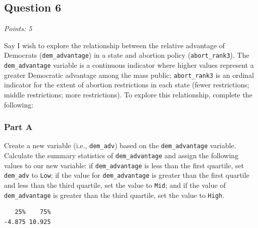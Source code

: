 \documentclass[
  letterpaper,
  DIV=11,
  numbers=noendperiod]{scrartcl}
\newenvironment{Shaded}{\begin{snugshade}}{\end{snugshade}}
\newcommand{\AttributeTok}[1]{\textcolor[rgb]{0.40,0.45,0.13}{#1}}
\newcommand{\FloatTok}[1]{\textcolor[rgb]{0.68,0.00,0.00}{#1}}
\newcommand{\FunctionTok}[1]{\textcolor[rgb]{0.28,0.35,0.67}{#1}}
\newcommand{\NormalTok}[1]{\textcolor[rgb]{0.00,0.23,0.31}{#1}}
\newcommand{\OtherTok}[1]{\textcolor[rgb]{0.00,0.23,0.31}{#1}}
\newcommand{\SpecialCharTok}[1]{\textcolor[rgb]{0.37,0.37,0.37}{#1}}
\begin{document}
\hypertarget{question-6}{%
\subsection{Question 6}\label{question-6}}

\emph{Points: 5}

Say I wish to explore the relationship between the relative advantage of
Democrats (\texttt{dem\_advantage}) in a state and abortion policy
(\texttt{abort\_rank3}). The \texttt{dem\_advantage} variable is a
continuous indicator where higher values represent a greater Democratic
advantage among the mass public; \texttt{abort\_rank3} is an ordinal
indicator for the extent of abortion restrictions in each state (fewer
restrictions; middle restrictions; more restrictions). To explore this
relationship, complete the following:

\hypertarget{part-a}{%
\subsubsection{Part A}\label{part-a}}

Create a new variable (i.e., \texttt{dem\_adv}) based on the
\texttt{dem\_advantage} variable. Calculate the summary statistics of
\texttt{dem\_advantage} and assign the following values to our new
variable: if \texttt{dem\_advantage} is less than the first quartile,
set \texttt{dem\_adv} to \texttt{Low}; if the value for
\texttt{dem\_advantage} is greater than the first quartile and less than
the third quartile, set the value to \texttt{Mid}; and if the value of
\texttt{dem\_advantage} is greater than the third quartile, set the
value to \texttt{High}.

\begin{Shaded}
\end{Shaded}

\begin{verbatim}
   25%    75% 
-4.875 10.925 
\end{verbatim}
\end{document}

